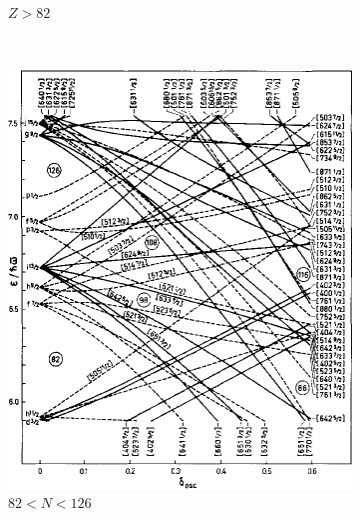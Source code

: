 \documentclass[10pt,a4paper, twoside]{report}
\begin{document}
\begin{figure}
\begin{subfigure}[b]{0.45\textwidth}
    \caption{$Z>82$}
\end{subfigure}
\\
\begin{subfigure}[b]{0.48\textwidth}
    \includegraphics[width=\textwidth]{./figures/Nilsson/neutron_deformed82.png}
    \caption{$82<N<126$}
\end{subfigure}	
\quad
\begin{subfigure}[b]{0.48\textwidth}

\end{subfigure}
\end{figure}
\end{document}
